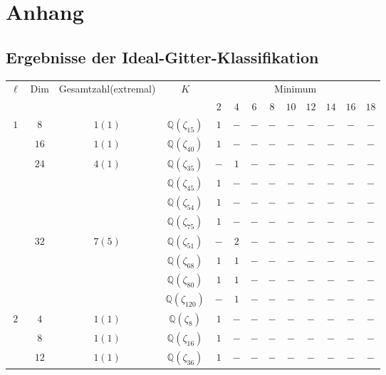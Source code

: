 \documentclass[12pt,a4paper,halfparskip,headsepline,bibtotocnumbered]{scrreprt}
\theoremstyle{nummermitklammern}
\theoremstyle{nonumberbreak}
\newcommand{\Q}{\mathbb{Q}}
\begin{document}
\chapter{Anhang}
\section{Ergebnisse der Ideal-Gitter-Klassifikation}
\begin{table}[H]
	\centering
	\begin{tabular}{|c|c|c|c|c|c|c|c|c|c|c|c|c|}
		\hline		
		\multirow{2}{*}{$\ell$}	&\multirow{2}{*}{Dim}	&\multirow{2}{*}{Gesamtzahl(extremal)}	&\multirow{2}{*}{$K$}	&\multicolumn{9}{c|}{Minimum}\\ \cline{5-13}
								&						&							&					&$2$	&$4$	&$6$	&$8$	&$10$	&$12$	&$14$	&$16$	&$18$\\ \hline
		\multirow{10}{*}{$1$}	&$8$					&$1(1)$						&$\Q(\zeta_{15})$	&$1$	&$-$	&$-$	&$-$	&$-$	&$-$	&$-$	&$-$	&$-$\\ \cline{2-13}
								&$16$					&$1(1)$						&$\Q(\zeta_{40})$	&$1$	&$-$	&$-$	&$-$	&$-$	&$-$	&$-$	&$-$	&$-$\\ \cline{2-13}
								&\multirow{4}{*}{$24$}	&\multirow{4}{*}{$4(1)$}	&$\Q(\zeta_{35})$	&$-$	&$1$	&$-$	&$-$	&$-$	&$-$	&$-$	&$-$	&$-$\\ \cline{4-13}
								&						&							&$\Q(\zeta_{45})$	&$1$	&$-$	&$-$	&$-$	&$-$	&$-$	&$-$	&$-$	&$-$\\ \cline{4-13}
								&						&							&$\Q(\zeta_{54})$	&$1$	&$-$	&$-$	&$-$	&$-$	&$-$	&$-$	&$-$	&$-$\\ \cline{4-13}
								&						&							&$\Q(\zeta_{75})$	&$1$	&$-$	&$-$	&$-$	&$-$	&$-$	&$-$	&$-$	&$-$\\ \cline{2-13}
								&\multirow{4}{*}{$32$}	&\multirow{4}{*}{$7(5)$}	&$\Q(\zeta_{51})$	&$-$	&$2$	&$-$	&$-$	&$-$	&$-$	&$-$	&$-$	&$-$\\ \cline{4-13}
								&						&							&$\Q(\zeta_{68})$	&$1$	&$1$	&$-$	&$-$	&$-$	&$-$	&$-$	&$-$	&$-$\\ \cline{4-13}
								&						&							&$\Q(\zeta_{80})$	&$1$	&$1$	&$-$	&$-$	&$-$	&$-$	&$-$	&$-$	&$-$\\ \cline{4-13}
								&						&							&$\Q(\zeta_{120})$	&$-$	&$1$	&$-$	&$-$	&$-$	&$-$	&$-$	&$-$	&$-$\\ \hline
		\multirow{3}{*}{$2$}	&$4$					&$1(1)$						&$\Q(\zeta_{8})$	&$1$	&$-$	&$-$	&$-$	&$-$	&$-$	&$-$	&$-$	&$-$\\ \cline{2-13}
								&$8$					&$1(1)$						&$\Q(\zeta_{16})$	&$1$	&$-$	&$-$	&$-$	&$-$	&$-$	&$-$	&$-$	&$-$\\ \cline{2-13}
								&$12$					&$1(1)$						&$\Q(\zeta_{36})$	&$1$	&$-$	&$-$	&$-$	&$-$	&$-$	&$-$	&$-$	&$-$\\ \hline
	\end{tabular}
\end{table}
\end{document}
